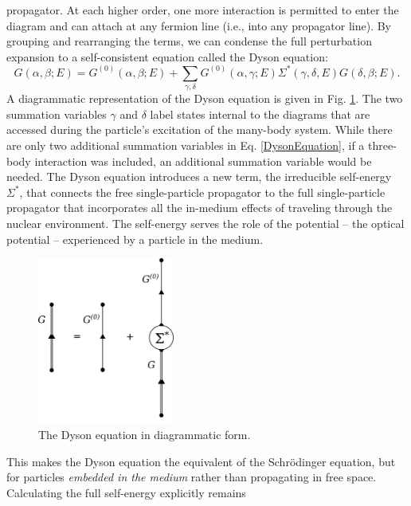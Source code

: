 propagator. At each higher order, one more interaction is permitted to enter the
diagram and can attach at any fermion line (i.e., into any propagator line). By grouping and rearranging the terms, we can 
condense the full perturbation expansion to a
self-consistent equation called the \gls{Dyson equation}:
\begin{equation} \label{DysonEquation}
    G(\alpha,\beta;E) = G^{(0)}(\alpha,\beta;E) +
    \sum_{\gamma,\delta}G^{(0)}(\alpha,\gamma;E)\Sigma^{*}(\gamma,\delta,E)G(\delta,
    \beta; E).
\end{equation}
A diagrammatic representation of the Dyson equation is given in Fig. \ref{DysonEquationDiagram}.
The two summation variables $\gamma$ and $\delta$ label states internal to the diagrams that are 
accessed during the particle's excitation of the many-body system\footnotemark.
\footnotetext
{
    While there are only two additional summation variables in Eq.
    \ref{DysonEquation}, if a three-body interaction was included,
    an additional summation variable would be needed.
}
The Dyson
equation introduces a new term, the irreducible \gls{self-energy} $\Sigma^{*}$, that connects the free
single-particle propagator to the full single-particle propagator that incorporates all the
in-medium effects of traveling through the nuclear environment. The self-energy serves the role
of the potential -- the \gls{optical potential} -- experienced by a particle in the medium.
\begin{figure}[bt]
    \centering
    \includegraphics[width=0.4\textwidth]{figures/DysonEquation.png}
    \caption{The Dyson equation in diagrammatic form.}
    \label{DysonEquationDiagram}
\end{figure}
This makes the Dyson equation the
equivalent of the Schr\"odinger equation, but for particles \textit{embedded in the medium} 
rather than propagating in free space. Calculating the full self-energy explicitly remains
